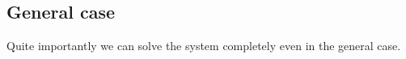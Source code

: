 \subsection{General case}

Quite importantly we can solve the system completely even in the general case. 